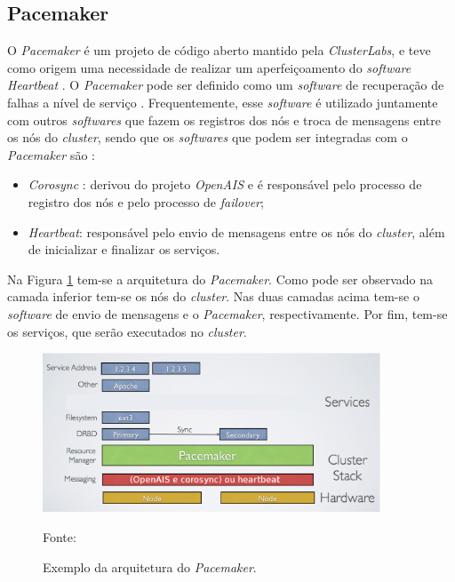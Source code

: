 
\subsection{Pacemaker}
\label{section:pacemaker}
O \textit{Pacemaker} \cite{pacemaker} é um projeto de código aberto mantido pela \textit{ClusterLabs}, e teve como origem uma necessidade 
de realizar um aperfeiçoamento do \textit{software} \textit{Heartbeat} \cite{heartbeat}. 
O \textit{Pacemaker} pode ser definido como um \textit{software} de recuperação de falhas a nível de serviço \cite{perkov2011}. 
Frequentemente, esse \textit{software} é utilizado juntamente com outros \textit{softwares} que fazem os registros dos nós e troca de mensagens entre os nós do 
\textit{cluster}, sendo que os \textit{softwares} que podem ser integradas com o \textit{Pacemaker} são \cite{pacemaker}:
\begin{itemize}
 \item \textit{Corosync} \cite{corosync}: derivou do projeto \textit{OpenAIS} e é responsável pelo processo de registro dos nós e pelo processo 
 de \textit{failover};
 \item \textit{Heartbeat}: responsável pelo envio de mensagens entre os nós do \textit{cluster}, além de inicializar e finalizar os serviços.
\end{itemize}


Na Figura \ref{fig:pacemaker_tools} tem-se a arquitetura do \textit{Pacemaker}. Como pode ser observado na camada inferior tem-se os nós do 
\textit{cluster}. Nas duas camadas acima tem-se o \textit{software} de envio de mensagens e o \textit{Pacemaker}, respectivamente. 
Por fim, tem-se os serviços, que serão executados no \textit{cluster}.

\begin{figure}[h!]
 \centering
 \includegraphics[width=380px]{img/pacemaker_tools.eps}
 \caption{Exemplo da arquitetura do \textit{Pacemaker}.}
 Fonte: \citet{pacemaker}
 \label{fig:pacemaker_tools}
\end{figure}

